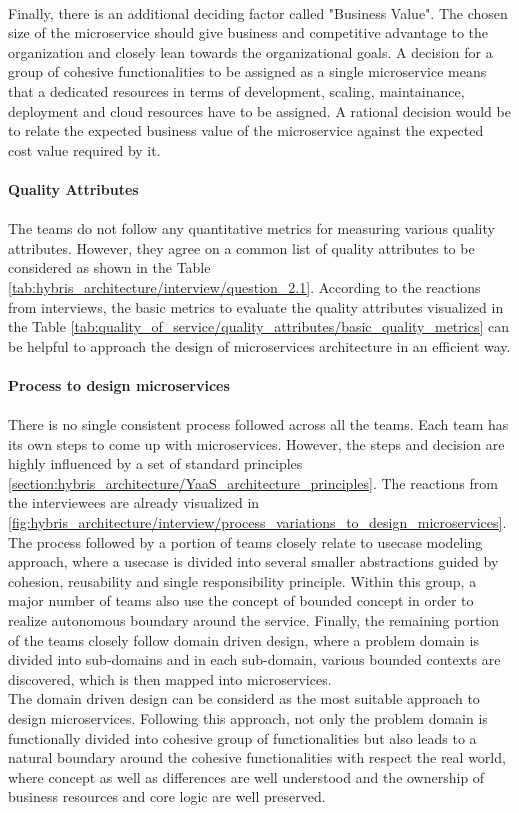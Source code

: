\\
Finally, there is an additional deciding factor called "Business Value". The chosen size of the microservice should give business and competitive advantage to the organization and closely lean towards the organizational goals. A decision for a group of cohesive functionalities to be assigned as a single microservice means that a dedicated resources in terms of development, scaling, maintainance, deployment and cloud resources have to be assigned. A rational decision would be to relate the expected business value of the microservice against the expected cost value required by it.
\\
\\
\textbf{Quality Attributes}
\\
\\
The teams do not follow any quantitative metrics for measuring various quality attributes. However, they agree on a common list of quality attributes to be considered as shown in the Table \ref{tab:hybris_architecture/interview/question_2.1}. According to the reactions from interviews, the basic metrics to evaluate the quality attributes visualized in the Table  \ref{tab:quality_of_service/quality_attributes/basic_quality_metrics} can be helpful to approach the design of microservices architecture in an efficient way.
\\
\\
\textbf{Process to design microservices}
\\
\\
There is no single consistent process followed across all the teams. Each team has its own steps to come up with microservices. However, the steps and decision are highly influenced by a set of  standard principles \ref{section:hybris_architecture/YaaS_architecture_principles}. The reactions from the interviewees are already visualized in \ref{fig:hybris_architecture/interview/process_variations_to_design_microservices}. 
\\
The process followed by a portion of teams closely relate to usecase modeling approach, where a usecase is divided into several smaller abstractions guided by cohesion, reusability and single responsibility principle. Within this group, a major number of teams also use the concept of bounded concept in order to realize autonomous boundary around the service. Finally, the remaining portion of the teams closely follow domain driven design, where a problem domain is divided into sub-domains and in each sub-domain, various bounded contexts are discovered, which is then mapped into microservices. 
\\
The domain driven design can be considerd as the most suitable approach to design microservices. Following this approach, not only the problem domain is functionally divided into cohesive group of functionalities but also leads to a natural boundary around the cohesive functionalities with respect the real world, where concept as well as differences are well understood and the ownership of business resources and core logic are well preserved.

